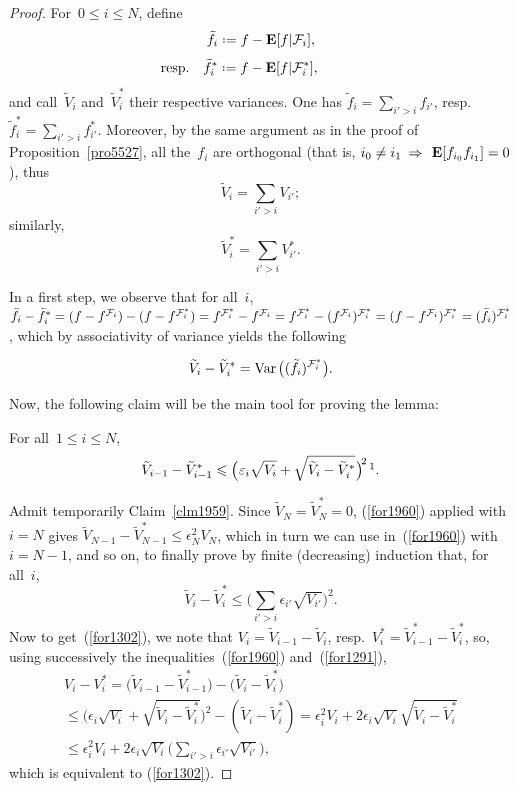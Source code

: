 \begin{proof}
For~$0\leq i\leq N$, define
\[ \tilde{f}_i \coloneqq f - \EE[f|\mcal{F}_i] ,\]
\[ \llap{\text{resp.}\quad} \tilde{f}^*_i \coloneqq f - \EE[f|\mcal{F}^*_i] ,\]
and call~$\tilde{V}_i$ and~$\tilde{V}^*_i$ their respective variances.
One has $\tilde{f}_i = \sum_{i'>i} f_{i'}$, resp.\ $\tilde{f}^*_i = \sum_{i'>i} f^*_{i'}$.
Moreover, by the same argument as in the proof of Proposition~\ref{pro5527},
all the~$f_i$ are orthogonal (that is, ${i_0\neq i_1} {\enskip\Rightarrow}\enskip \EE[f_{i_0}f_{i_1}] = 0$),
thus
\[ \tilde{V}_i = \sum_{i'>i} V_{i'} ;\]
similarly,
\[ \tilde{V}^*_i = \sum_{i'>i} V^*_{i'} .\]

In a first step, we observe that for all~$i$,
$\tilde{f}_i - \tilde{f}^*_i = (f-f^{\mcal{F}_i}) - (f-f^{\mcal{F}^*_i})
= f^{\mcal{F}^*_i} - f^{\mcal{F}_i} = {f^{\mcal{F}^*_i} - (f^{\mcal{F}_i})^{\mcal{F}^*_i}} \ab = (f - f^{\mcal{F}_i})^{\mcal{F}^*_i} = (\tilde{f}_i)^{\mcal{F}^*_i}$,
which by associativity of variance yields the following
%
\begin{Clm}\label{clm1908}
\[\label{for4854} \tilde{V}_i - \tilde{V}^*_i = \Var\big((\tilde{f}_i)^{\mcal{F}^*_i}\big).\]
\end{Clm}

Now, the following claim will be the main tool for proving the lemma:
%
\begin{Clm}\label{clm1959}
For all~$1 \leq i \leq N$,
\[\label{for1960}
\tilde{V}_{i-1} - \tilde{V}^*_{i-1} \leq \Big( \epsilon_i \sqrt{V_i} + \sqrt{\tilde{V}_i-\tilde{V}^*_i} \Big)^{\!2\,}
\footnotemark .\]
\end{Clm}
%

Admit temporarily Claim~\ref{clm1959}. Since $\tilde{V}_N= \tilde{V}^*_N = 0$,
(\ref{for1960}) applied with $i=N$ gives $\tilde{V}_{N-1} - \tilde{V}^*_{N-1} \leq \epsilon_N^2 V_N$,
which in turn we can use in~(\ref{for1960}) with $i=N-1$, and so on,
to finally prove by finite (decreasing) induction that, for all~$i$,
\[\label{for1291}
\tilde{V}_i - \tilde{V}^*_i \leq \Big( \sum_{i'>i}\epsilon_{i'}\sqrt{V_{i'}} \Big)^2 .\]
Now to get~(\ref{for1302}),
we note that $V_i = \tilde{V}_{i-1} - \tilde{V}_i$,
resp.\ $V^*_i = \tilde{V}^*_{i-1} - \tilde{V}^*_i$,
so, using successively the inequalities~(\ref{for1960}) and~(\ref{for1291}),
\begin{multline}
V_i - V^*_i = \big( \tilde{V}_{i-1} - \tilde{V}^*_{i-1} \big)
- \big( \tilde{V}_i - \tilde{V}^*_i \big) \\
\leq \Big( \epsilon_i \sqrt{V_i} + \sqrt{\tilde{V}_i - \tilde{V}^*_i} \Big)^2
- (\tilde{V}_i - \tilde{V}^*_i)
= \epsilon_i^2 V_i + 2 \epsilon_i\sqrt{V_i} \sqrt{\tilde{V}_i - \tilde{V}^*_i} \\
\leq \epsilon_i^2 V_i + 2 \epsilon_i\sqrt{V_i} \Big( \sum_{i'>i}\epsilon_{i'}\sqrt{V_{i'}} \Big),
\end{multline}
which is equivalent to (\ref{for1302}).
\end{proof}

